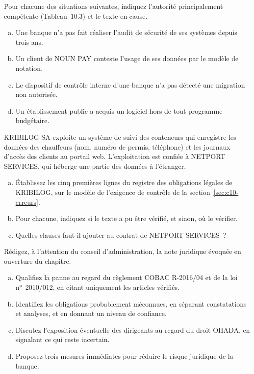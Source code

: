 \bigskip

\begin{boxexo}[title={\ding{45}\quad Exercice~10.1. Qui est compétent~? \niveaubase}]
Pour chacune des situations suivantes, indiquez l'autorité principalement
compétente (Tableau~10.3) et le texte en cause.
\begin{enumerate}[(a)]
    \item Une banque n'a pas fait réaliser l'audit de sécurité de ses
          systèmes depuis trois ans.
    \item Un client de NOUN PAY conteste l'usage de ses données par le
          modèle de notation.
    \item Le dispositif de contrôle interne d'une banque n'a pas détecté
          une migration non autorisée.
    \item Un établissement public a acquis un logiciel hors de tout
          programme budgétaire.
\end{enumerate}
\end{boxexo}

\begin{boxexo}[title={\ding{45}\quad Exercice~10.2. Le registre de KRIBILOG \niveaumoyen}]
KRIBILOG SA exploite un système de suivi des conteneurs qui enregistre les
données des chauffeurs (nom, numéro de permis, téléphone) et les journaux
d'accès des clients au portail web. L'exploitation est confiée à NETPORT
SERVICES, qui héberge une partie des données à l'étranger.
\begin{enumerate}[(a)]
    \item Établissez les cinq premières lignes du registre des obligations
          légales de KRIBILOG, sur le modèle de l'exigence de contrôle de
          la section~\ref{sec:c10-erreurs}.
    \item Pour chacune, indiquez si le texte a pu être vérifié, et sinon,
          où le vérifier.
    \item Quelles clauses faut-il ajouter au contrat de NETPORT SERVICES~?
\end{enumerate}
\end{boxexo}

\begin{boxexo}[title={\ding{45}\quad Exercice~10.3. La note au conseil de la BANQUE SANAGA \niveauexpert}]
Rédigez, à l'attention du conseil d'administration, la note juridique
évoquée en ouverture du chapitre.
\begin{enumerate}[(a)]
    \item Qualifiez la panne au regard du règlement COBAC R-2016/04 et de la
          loi n°~2010/012, en citant uniquement les articles vérifiés.
    \item Identifiez les obligations probablement méconnues, en séparant
          constatations et analyses, et en donnant un niveau de confiance.
    \item Discutez l'exposition éventuelle des dirigeants au regard du
          droit OHADA, en signalant ce qui reste incertain.
    \item Proposez trois mesures immédiates pour réduire le risque
          juridique de la banque.
\end{enumerate}
\end{boxexo}

